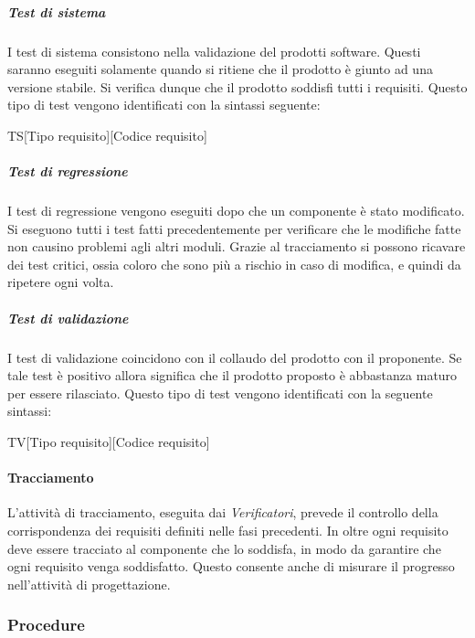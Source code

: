 				 \subparagraph{Test di sistema}
				 I test di sistema consistono nella validazione del prodotti software. Questi saranno eseguiti solamente quando si ritiene che il prodotto è giunto ad una versione stabile. Si verifica dunque che il prodotto soddisfi tutti i requisiti. Questo tipo di test vengono identificati con la sintassi seguente: \\
				\begin{center}
				 	TS[Tipo requisito][Codice requisito]
				 \end{center}

				 \subparagraph{Test di regressione}
				 I test di regressione vengono eseguiti dopo che un componente è stato modificato. Si eseguono tutti i test fatti precedentemente per verificare che le modifiche fatte non causino problemi agli altri moduli. Grazie al tracciamento si possono ricavare dei test critici, ossia coloro che sono più a rischio in caso di modifica, e quindi da ripetere ogni volta.
				
				 \subparagraph{Test di validazione}
				 \label{subp:validazione}
				 I test di validazione coincidono con il collaudo del prodotto con il proponente. Se tale test è positivo allora significa che il prodotto proposto è abbastanza maturo per essere rilasciato. Questo tipo di test vengono identificati con la seguente sintassi:\\
				 \begin{center}
				 	TV[Tipo requisito][Codice requisito]
				 \end{center}

			\paragraph{Tracciamento} %
			\label{par:tracciamento}
			L'attività di tracciamento, eseguita dai \emph{Verificatori}, prevede il controllo della corrispondenza dei requisiti definiti nelle fasi precedenti. In oltre ogni requisito deve essere tracciato al componente che lo soddisfa, in modo da garantire che ogni requisito venga soddisfatto. Questo consente anche di misurare il progresso nell'attività di progettazione.


		\subsubsection{Procedure}
		\label{ssub:procedure}

